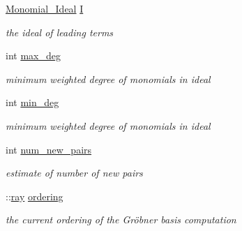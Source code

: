 \begin{DoxyCompactItemize}
\item 
\mbox{\label{class_p_p_with_ideal_a8420b03d8ff30fd0f59f9059a1c2ebf2}} 
\hyperlink{class_monomial___ideal}{Monomial\+\_\+\+Ideal} \hyperlink{class_p_p_with_ideal_a8420b03d8ff30fd0f59f9059a1c2ebf2}{I}
\begin{DoxyCompactList}\small\item\em the ideal of leading terms \end{DoxyCompactList}\item 
\mbox{\label{class_p_p_with_ideal_a8271676ce9422ea311a93aac66e8470d}} 
int \hyperlink{class_p_p_with_ideal_a8271676ce9422ea311a93aac66e8470d}{max\+\_\+deg}
\begin{DoxyCompactList}\small\item\em minimum weighted degree of monomials in ideal \end{DoxyCompactList}\item 
\mbox{\label{class_p_p_with_ideal_a698239aea883e7b53c9e670a91f0c30d}} 
int \hyperlink{class_p_p_with_ideal_a698239aea883e7b53c9e670a91f0c30d}{min\+\_\+deg}
\begin{DoxyCompactList}\small\item\em minimum weighted degree of monomials in ideal \end{DoxyCompactList}\item 
\mbox{\label{class_p_p_with_ideal_a25bad843201118123213603384f208ba}} 
int \hyperlink{class_p_p_with_ideal_a25bad843201118123213603384f208ba}{num\+\_\+new\+\_\+pairs}
\begin{DoxyCompactList}\small\item\em estimate of number of new pairs \end{DoxyCompactList}\item 
\mbox{\label{class_p_p_with_ideal_a58f415a5c63a67ca1dfcec9bf060eec4}} 
\+::\hyperlink{classray}{ray} \hyperlink{class_p_p_with_ideal_a58f415a5c63a67ca1dfcec9bf060eec4}{ordering}
\begin{DoxyCompactList}\small\item\em the current ordering of the Gr\"{o}bner basis computation \end{DoxyCompactList}\item 

\end{DoxyCompactItemize}
